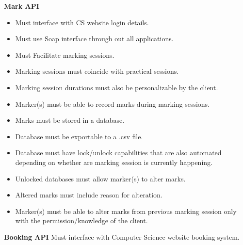 \documentclass[10pt,a4paper]{article}
\begin{document}
	\textbf{Mark API}
	\begin{itemize}
		\item Must interface with CS website login details.
		\item Must use Soap interface through out all applications.
		\item Must Facilitate marking sessions.
		\item Marking sessions must coincide with practical sessions.
		\item Marking session durations must also be personalizable by the client.
		\item Marker(s) must be able to record marks during marking sessions.
		\item Marks must be stored in a database.
		\item Database must be exportable to a .csv file.
		\item Database must have lock/unlock capabilities that are also automated depending on whether are marking session is currently happening.
		\item Unlocked databases must allow marker(s) to alter marks.
		\item Altered marks must include reason for alteration.
		\item Marker(s) must be able to alter marks from previous marking session only with the permission/knowledge of the client.
	\end{itemize}
		
	\textbf{Booking API} \newline
	\indent Must interface with Computer Science website booking system. 
                
\end{document}
